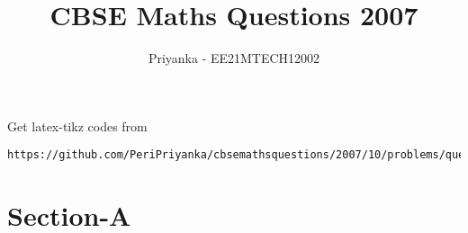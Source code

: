 \documentclass[journal,12pt,twocolumn]{IEEEtran}
\begin{document}
     \def\rightbox#1{\makebox[0in][r]{#1}}
     \def\centbox#1{\makebox[0in]{#1}}
     \def\topbox#1{\raisebox{-\baselineskip}[0in][0in]{#1}}
     \def\midbox#1{\raisebox{-0.5\baselineskip}[0in][0in]{#1}}
\vspace{3cm}
\title{CBSE Maths Questions 2007}
\author{Priyanka - EE21MTECH12002}
\maketitle
\newpage
\bigskip
\renewcommand{\thefigure}{\theenumi}
\renewcommand{\thetable}{\theenumi}
%
Get latex-tikz codes from 
%
\begin{lstlisting}
https://github.com/PeriPriyanka/cbsemathsquestions/2007/10/problems/questions
\end{lstlisting}
\section{Section-A}
\end{document}
